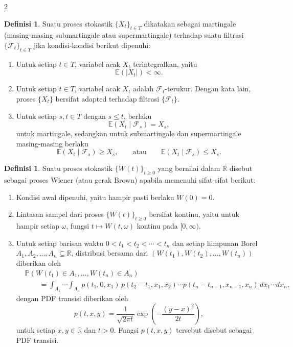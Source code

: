 \documentclass[a4paper,extrafontsizes, 9pt]{memoir}
\theoremstyle{definition}
\newtheorem{definisi}[kalstok]{Definisi}
\theoremstyle{plain}
\theoremstyle{remark}
\begin{document}
\begin{multicols}{2}
  \begin{definisi}
    Suatu proses stokastik $\{X_t\}_{t\in T}$ dikatakan sebagai martingale
    (masing-masing submartingale atau supermartingale) terhadap suatu filtrasi
    $\{\mathcal{F}_t\}_{t\in T}$ jika kondisi-kondisi berikut dipenuhi:
    \begin{enumerate}[leftmargin=*, itemsep=0.5mm]
      \item Untuk setiap $t\in T$, variabel acak $X_t$ terintegralkan, yaitu
            \[\mathbb{E}(|X_t|)<\infty.\]
      \item Untuk setiap $t\in T$, variabel acak $X_t$ adalah $\mathcal{F}_t$-terukur. Dengan
            kata lain, proses $\{X_t\}$ bersifat adapted terhadap filtrasi $\{\mathcal{F}_t\}$.
      \item Untuk setiap $s,t\in T$ dengan $s\le t$, berlaku
            \[\mathbb{E}(X_t\mid\mathcal{F}_s)=X_s,\]
            untuk martingale, sedangkan untuk submartingale dan supermartingale masing-masing
            berlaku
            \[\mathbb{E}(X_t\mid\mathcal{F}_s)\ge X_s,\qquad
              \text{atau}\qquad \mathbb{E}(X_t\mid\mathcal{F}_s)\le X_s.\]
    \end{enumerate}
  \end{definisi}

  \begin{definisi}
    Suatu proses stokastik $\{W(t)\}_{t\ge 0}$ yang bernilai dalam $\mathbb{R}$ disebut sebagai
    proses Wiener (atau gerak Brown) apabila memenuhi sifat-sifat berikut:
    \begin{enumerate}[leftmargin=*, itemsep=0.5mm]
      \item Kondisi awal dipenuhi, yaitu hampir pasti berlaku
            $W(0)=0.$
      \item Lintasan sampel dari proses $\{W(t)\}_{t\ge 0}$ bersifat kontinu, yaitu untuk hampir
            setiap $\omega$, fungsi $t\mapsto W(t,\omega)$ kontinu pada $[0,\infty)$.
      \item Untuk setiap barisan waktu $0<t_1<t_2<\cdots<t_n$ dan setiap himpunan Borel
            $A_1,A_2,\ldots,A_n\subseteq\mathbb{R}$, distribusi bersama dari
            $(W(t_1),W(t_2),\ldots,W(t_n))$ diberikan oleh
            \begin{align*}
               & \mathbb{P}(W(t_1)\in A_1,\ldots,W(t_n)\in A_n) \\
               & \qquad =\int_{A_1}\cdots\int_{A_n}
              p(t_1,0,x_1)\,p(t_2-t_1,x_1,x_2)\cdots p(t_n-t_{n-1},x_{n-1},x_n)\,
              dx_1\cdots dx_n,
            \end{align*}
            dengan PDF transisi diberikan oleh
            \[p(t,x,y)=\frac{1}{\sqrt{2\pi t}}
              \exp\!\left(-\frac{(y-x)^2}{2t}\right),\]
            untuk setiap $x,y\in\mathbb{R}$ dan $t>0$. Fungsi $p(t,x,y)$ tersebut disebut
            sebagai PDF transisi.
    \end{enumerate}
  \end{definisi}


\end{multicols}
\end{document}
